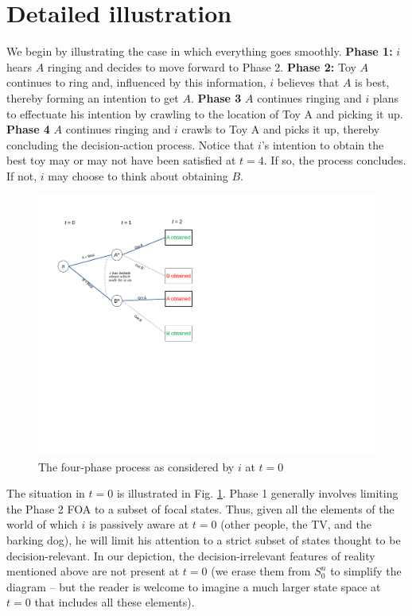 \documentclass[
11pt,
titlepage,
reqno,
]{article}%
\theoremstyle{definition}
\begin{document}
\section*{Detailed illustration}
We  begin by illustrating the case in which everything goes smoothly. \textbf{Phase 1:} $i$ hears $A$ ringing and decides to move forward to Phase 2. \textbf{Phase 2:} Toy $A$ continues to ring and, influenced by this information, $i$  believes that $A$ is best, thereby forming an intention to get $A$. \textbf{Phase 3} $A$ continues ringing and  $i$  plans to effectuate his intention by crawling to the location of Toy A and picking it up. \textbf{Phase 4} $A$ continues ringing and $i$ crawls to Toy A and picks it up, thereby concluding the decision-action process. Notice that $i$'s intention to obtain the best toy may or may not have been satisfied at $t=4$. If so, the process concludes. If not, $i$ may choose to think about obtaining $B$.

\begin{figure}[h!]
	\centering
	\includegraphics*[page=4,trim = 0 0in 0in 0in,scale=.60]{Awareness_Diagrams_All}
	\caption{The four-phase process as considered by $i$ at $t=0$\label{Diag: p-04}}%
\end{figure}

The situation in $t=0$ is illustrated in Fig. \ref{Diag: p-04}. Phase 1 generally involves limiting the Phase 2 FOA to a subset of focal states. Thus, given all the elements of the world of which $i$ is passively aware at $t=0$ (other people, the TV, and the barking dog), he will limit his attention to a strict subset of states thought to be  decision-relevant. In our depiction, the decision-irrelevant features of reality mentioned above are not present at $t=0$ (we erase them from $S^n_0$ to simplify the diagram -- but the reader is welcome to imagine a much larger state space at $t=0$ that includes all these elements).
\end{document}
